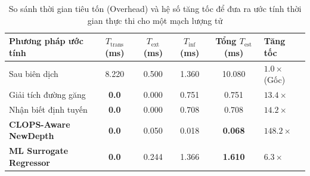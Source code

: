 \documentclass[11pt, a4paper]{article}
\begin{document}
\begin{table}[htbp]
\centering
\caption{So sánh thời gian tiêu tốn (Overhead) và hệ số tăng tốc để đưa ra ước tính thời gian thực thi cho một mạch lượng tử}
\label{tab:rq2_overhead}
\small
\begin{tabularx}{\textwidth}{p{4.6cm} c c c c >{\centering\arraybackslash}X}
\toprule
\textbf{Phương pháp ước tính} & \textbf{$T_{\text{trans}}$ (ms)} & \textbf{$T_{\text{ext}}$ (ms)} & \textbf{$T_{\text{inf}}$ (ms)} & \textbf{Tổng $T_{\text{est}}$ (ms)} & \textbf{Tăng tốc} \\
\midrule
Sau biên dịch \cite{ma2025understanding} & 8.220 & 0.500 & 1.360 & 10.080 & $1.0\times$ (Gốc) \\
\midrule
Giải tích đường găng & \textbf{0.0} & 0.000 & 0.751 & 0.751 & $13.4\times$ \\
Nhận biết định tuyến & \textbf{0.0} & 0.000 & 0.708 & 0.708 & $14.2\times$ \\
\textbf{CLOPS-Aware NewDepth} & \textbf{0.0} & 0.050 & 0.018 & \textbf{0.068} & $\mathbf{148.2\times}$ \\
\textbf{ML Surrogate Regressor} & \textbf{0.0} & 0.244 & 1.366 & \textbf{1.610} & $\mathbf{6.3\times}$ \\
\bottomrule
\end{tabularx}
\end{table}
\end{document}
